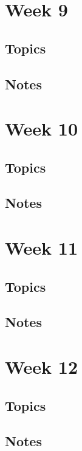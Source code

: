 \documentclass[12pt]{article}
\begin{document}
\section{Week 9}

\subsection{Topics}

\subsection{Notes}





\section{Week 10}

\subsection{Topics}

\subsection{Notes}





\section{Week 11}

\subsection{Topics}

\subsection{Notes}





\section{Week 12}

\subsection{Topics}

\subsection{Notes}
\end{document}
